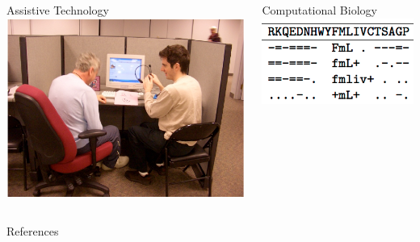 \documentclass[compress]{beamer}
\begin{document}
{\begin{columns}



    \begin{block}{Assistive Technology}
     \centering
        \includegraphics[width=0.4\linewidth]{evocation/figures/jordan_at_adler}
        \\
     \small
       \cite{boyd-graber-06b,ma-09,nikolova-09}
    \end{block}




   \begin{block}{Computational Biology}
     \centering
     \includegraphics[width=0.4\linewidth]{general_figures/protein} \\
     \small
     \cite{nguyen-13b,hu-13:coalescent}
   \end{block}


\end{columns}

}






\begin{frame}{References}

\tiny

\end{frame}
\end{document}
